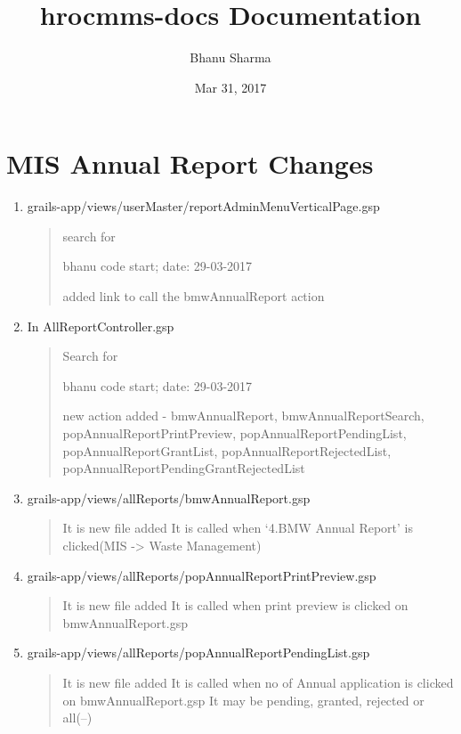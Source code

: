 \documentclass[letterpaper,10pt,english]{sphinxmanual}
\title{hrocmms-docs Documentation}
\date{Mar 31, 2017}
\author{Bhanu Sharma}
\begin{document}
\maketitle
\sphinxtableofcontents
{}\label{\detokenize{index::doc}}



\chapter{MIS Annual Report Changes}
\label{\detokenize{MIS Annual Report Changes:welcome-to-hrocmms-docs-s}}\label{\detokenize{MIS Annual Report Changes::doc}}\label{\detokenize{MIS Annual Report Changes:mis-annual-report-changes}}\begin{enumerate}
\item {} 
grails-app/views/userMaster/reportAdminMenuVerticalPage.gsp
\begin{quote}

search for

bhanu code start; date: 29-03-2017

added link to call the bmwAnnualReport action
\end{quote}

\item {} 
In AllReportController.gsp
\begin{quote}

Search for

bhanu code start; date: 29-03-2017

new action added - bmwAnnualReport, bmwAnnualReportSearch, popAnnualReportPrintPreview, popAnnualReportPendingList,
popAnnualReportGrantList, popAnnualReportRejectedList, popAnnualReportPendingGrantRejectedList
\end{quote}

\item {} 
grails-app/views/allReports/bmwAnnualReport.gsp
\begin{quote}

It is new file added
It is called when `4.BMW Annual Report' is clicked(MIS -\textgreater{} Waste Management)
\end{quote}

\item {} 
grails-app/views/allReports/popAnnualReportPrintPreview.gsp
\begin{quote}

It is new file added
It is called when print preview is clicked on bmwAnnualReport.gsp
\end{quote}

\item {} 
grails-app/views/allReports/popAnnualReportPendingList.gsp
\begin{quote}

It is new file added
It is called when no of Annual application is clicked on bmwAnnualReport.gsp
It may be pending, granted, rejected or all(--)
\end{quote}

\end{enumerate}
\end{document}
